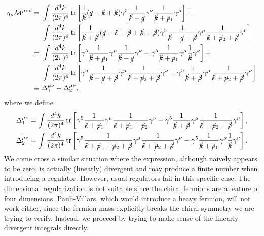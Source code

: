 \documentclass[aps,prb,superscriptaddress,nofootinbib]{revtex4}
\def \tr{\operatorname{tr}}
\begin{document}
\begin{equation}
\begin{aligned}
	q_\rho \mathcal{M}^{\mu\nu\rho} 
	=&\ \int \frac{d^{4} k}{(2 \pi)^{4}} \tr\left[\frac{1}{\cancel k} (\cancel{q}-\cancel{k}+\cancel{k}) \gamma^{5} \frac{1}{\cancel k-\cancel q} \gamma^{\nu} \frac{1}{\cancel k+\cancel p_{1}} \gamma^\mu \right] + \\
	&\ \int \frac{d^{4} k}{(2 \pi)^{4}} \tr\left[\frac{1}{\cancel k +\cancel \beta} (\cancel{q}-\cancel{k}-\cancel \beta +\cancel{k} +\cancel\beta) \gamma^{5} \frac{1}{\cancel k-\cancel q+\cancel\beta} \gamma^{\mu} \frac{1}{\cancel k+\cancel p_{2}+\cancel \beta} \gamma^\nu \right] \\
	=&\ \int \frac{d^{4} k}{(2 \pi)^{4}} \tr\left[\gamma^{5} \frac{1}{\cancel k+\cancel p_{1}} \gamma^\mu \frac{1}{\cancel k-\cancel q} \gamma^{\nu}  -  \gamma^{5}   \frac{1}{\cancel k+\cancel p_{1}} \gamma^\mu \frac{1}{\cancel k} \gamma^{\nu} \right]+ \\
	&\ \int \frac{d^{4} k}{(2 \pi)^{4}} \tr\left[\gamma^{5} \frac{1}{\cancel k-\cancel q+\cancel\beta} \gamma^{\mu} \frac{1}{\cancel k+\cancel p_{2}+\cancel \beta} \gamma^\nu -\gamma^5\frac{1}{\cancel k+\cancel\beta}\gamma^\mu\frac{1}{\cancel k+\cancel p_2+\cancel\beta}\gamma^\nu\right] \\
	\equiv &\ \Delta^{\mu\nu}_1 + \Delta^{\mu\nu}_2,
\end{aligned}
\end{equation}
where we define
\begin{equation}\label{eq:AN-Tri-div-int}
\begin{aligned}
	\Delta^{\mu\nu}_1 &= \int \frac{d^{4} k}{(2 \pi)^{4}} \tr\left[
		\gamma^{5} \frac{1}{\cancel k+\cancel p_{1}} \gamma^\mu \frac{1}{\cancel k+\cancel p_1+\cancel p_2} \gamma^{\nu} -
		\gamma^5\frac{1}{\cancel k+\cancel\beta}\gamma^\mu\frac{1}{\cancel k+\cancel p_2+\cancel\beta}\gamma^\nu 
	\right], \\
	\Delta^{\mu\nu}_2 &= \int \frac{d^{4} k}{(2 \pi)^{4}} \tr\left[
		\gamma^{5} \frac{1}{\cancel k+\cancel p_1 +\cancel p_2+\cancel\beta} \gamma^{\mu} \frac{1}{\cancel k+\cancel p_{2}+\cancel \beta} \gamma^\nu -
		\gamma^{5}   \frac{1}{\cancel k+\cancel p_{1}} \gamma^\mu \frac{1}{\cancel k} \gamma^{\nu}
	\right].
\end{aligned}
\end{equation}
We come cross a similar situation where the expression, although naively appears to be zero, is actually (linearly) divergent and may produce a finite number when introducing a regulator.
However, usual regulators fail in this specific case.
The dimensional regularization is not suitable since the chiral fermions are a feature of four dimensions.
Pauli-Villars, which would introduce a heavy fermion, will not work either, since the fermion mass explicitly breaks the chiral symmetry we are trying to verify. 
Instead, we proceed by trying to make sense of the linearly divergent integrals directly.
\end{document}
